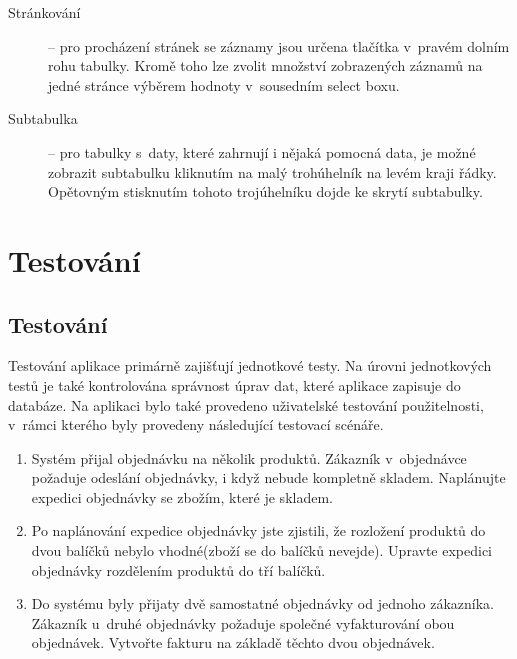 \documentclass[thesis=B,czech]{FITthesis}[2012/06/26]
\begin{document}
\begin{description}
		\item[Stránkování] -- pro procházení stránek se záznamy jsou určena tlačítka v~pravém dolním rohu tabulky. Kromě toho lze zvolit množství zobrazených záznamů na jedné stránce výběrem hodnoty v~sousedním select boxu.
		\item[Subtabulka] -- pro tabulky s~daty, které zahrnují i nějaká pomocná data, je možné zobrazit subtabulku kliknutím na malý trohúhelník na levém kraji řádky. Opětovným stisknutím tohoto trojúhelníku dojde ke skrytí subtabulky.
	\end{description}

\chapter{Testování}

\section{Testování}
	Testování aplikace primárně zajišťují jednotkové testy. Na úrovni jednotkových testů je také kontrolována správnost úprav dat, které aplikace zapisuje do databáze. Na aplikaci bylo také provedeno uživatelské testování použitelnosti, v~rámci kterého byly provedeny následující testovací scénáře.
	\begin{enumerate}
		\item Systém přijal objednávku na několik produktů. Zákazník v~objednávce požaduje odeslání objednávky, i když nebude kompletně skladem. Naplánujte expedici objednávky se zbožím, které je skladem. %
		\item Po naplánování expedice objednávky jste zjistili, že rozložení produktů do dvou balíčků nebylo vhodné(zboží se do balíčků nevejde). Upravte expedici objednávky rozdělením produktů do tří balíčků.
		\item Do systému byly přijaty dvě samostatné objednávky od jednoho zákazníka. Zákazník u~druhé objednávky požaduje společné vyfakturování obou objednávek. Vytvořte fakturu na základě těchto dvou objednávek.
	\end{enumerate}
\end{document}
